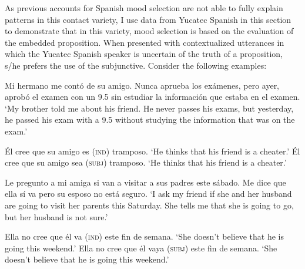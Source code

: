 \documentclass[output=paper,colorlinks,citecolor=brown,
]{langscibook}
\begin{document}
As previous accounts for Spanish mood selection are not able to fully explain patterns in this contact variety, I use data from Yucatec Spanish in this section to demonstrate that in this variety, mood selection is based on the evaluation of the embedded proposition. When presented with contextualized utterances in which the Yucatec Spanish speaker is uncertain of the truth of a proposition, s/he prefers the use of the subjunctive. Consider the following examples:

\begin{exe} %
    \ex\label{ex:bove:13} 
 Mi hermano me contó de su amigo. Nunca aprueba los exámenes, pero ayer, aprobó el examen con un 9.5 sin estudiar la información que estaba en el examen.
 \glt `My brother told me about his friend. He never passes his exams, but yesterday, he passed his exam with a 9.5 without studying the information that was on the exam.'
 
    \begin{xlist} %
        \ex \label{ex:bove:13a}
            Él cree que su amigo es (\textsc{ind}) tramposo.%
                   \glt `He thinks that his friend is a cheater.'
        \ex\label{ex:bove:13b}
           Él cree que su amigo sea (\textsc{subj}) tramposo.
             \glt `He thinks that his friend is a cheater.'
\end{xlist}
\end{exe}

\begin{exe} %
    \ex\label{ex:bove:14} 
  Le pregunto a mi amiga si van a visitar a sus padres este sábado. Me dice que ella sí va pero su esposo no está seguro.
 \glt `I ask my friend if she and her husband are going to visit her parents this Saturday. She tells me that she is going to go, but her husband is not sure.'
 
    \begin{xlist} %
        \ex \label{ex:bove:14a}
            Ella no cree que él va (\textsc{ind}) este fin de semana.%
                   \glt `She doesn’t believe that he is going this weekend.'
        \ex\label{ex:bove:14b}
           Ella no cree que él vaya (\textsc{subj}) este fin de semana.
             \glt `She doesn’t believe that he is going this weekend.'
\end{xlist}
\end{exe}
\end{document}
